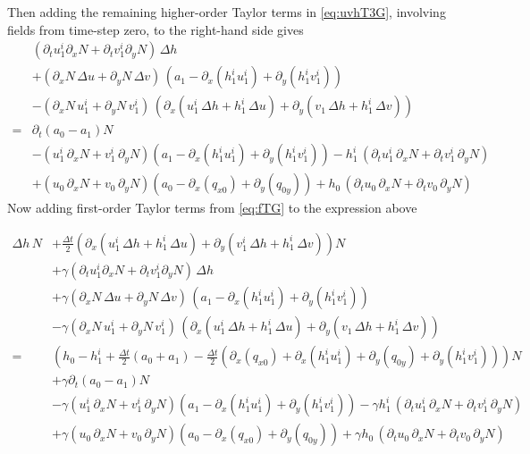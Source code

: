 \documentclass[10pt,a4paper]{book}
\newcommand{\p}{\partial}
\begin{document}
Then adding the remaining higher-order Taylor terms in \eqref{eq:uvhT3G},
involving fields from time-step zero,  to the right-hand side gives
\begin{align*}
& (\p_t u^i_1 \p_x N +\p_t v^i_1 \p_y N ) \, \Delta h  \\
&+  (\p_x N \, \Delta u+\p_y N \, \Delta v) \, (a_1- \p_x (h^i_1 u^i_1) +\p_y (h^i_1 v^i_1))  \\
&- (\p_x N \, u^i_1    +\p_y N \, v^i_1 )  \, (\p_x (u^i_1 \, \Delta h + h^i_1\,\Delta u ) +\p_y (v_1 \, \Delta h + h^i_1 \, \Delta v)) \\
=& \p_t (a_0-a_1) N \\
&-  ( u^i_1 \,\p_x N + v^i_1 \, \p_y N)   (a_1- \p_x ( h^i_1 u^i_1)+\p_y (h^i_1 v^i_1))  - h^i_1 \, (\p_t u^i_1 \, \p_x N + \p_t v^i_1 \, \p_y N)  \\
&+  (u_0   \,\p_x N + v_0  \,  \p_y N)   (a_0 - \p_x ( q_{x0} ) + \p_y  (q_{0y} )  )   + h_0   \,  (\p_t u_0   \, \p_x N + \p_t v_0 \, \p_y N) 
\end{align*}
Now adding first-order Taylor terms from \eqref{eq:fTG} to the expression above

\begin{align*}
\Delta h  \, N&+ \frac{\Delta t}{2}\left ( \p_x(u^i_1 \, \Delta h  + h^i_1 \,\Delta u ) + \p_y (v^i_1 \, \Delta h  + h^i_1 \,\Delta v ) \right ) N\\
&+ \gamma (\p_t u^i_1 \p_x N +\p_t v^i_1 \p_y N ) \, \Delta h  \\
&+  \gamma (\p_x N \, \Delta u+\p_y N \, \Delta v) \, (a_1- \p_x (h^i_1 u^i_1) +\p_y (h^i_1 v^i_1))  \\
&- \gamma (\p_x N \, u^i_1    +\p_y N \, v^i_1 )  \, (\p_x (u^i_1 \, \Delta h + h^i_1\,\Delta u ) +\p_y (v_1 \, \Delta h + h^i_1 \, \Delta v)) \\
=&\left ( h_0-h^i_1+\frac{\Delta t}{2}(a_0+a_1)- \frac{\Delta t}{2}(\p_x(q_{x0})+\p_x(h^i_1 u^i_1) + \p_y(q_{0y})+\p_y(h^i_1 v^i_1))  \right ) N\\
&+ \gamma \p_t (a_0-a_1) N \\
&-  \gamma ( u^i_1 \,\p_x N + v^i_1 \, \p_y N)   (a_1- \p_x ( h^i_1 u^i_1)+\p_y (h^i_1 v^i_1))  - \gamma h^i_1 \, (\p_t u^i_1 \, \p_x N + \p_t v^i_1 \, \p_y N)  \\
&+  \gamma(u_0   \,\p_x N + v_0  \,  \p_y N)   (a_0 - \p_x ( q_{x0} ) + \p_y  (q_{0y} )  )   + \gamma h_0   \,  (\p_t u_0   \, \p_x N + \p_t v_0 \, \p_y N) 
\end{align*}
\end{document}
